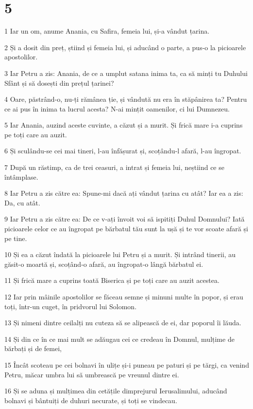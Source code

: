 \chapter{5}

\par 1 Iar un om, anume Anania, cu Safira, femeia lui, și-a vândut țarina.
\par 2 Și a dosit din preț, știind și femeia lui, și aducând o parte, a pus-o la picioarele apostolilor.
\par 3 Iar Petru a zis: Anania, de ce a umplut satana inima ta, ca să minți tu Duhului Sfânt și să dosești din prețul țarinei?
\par 4 Oare, păstrând-o, nu-ți rămânea ție, și vândută nu era în stăpânirea ta? Pentru ce ai pus în inima ta lucrul acesta? N-ai mințit oamenilor, ci lui Dumnezeu.
\par 5 Iar Anania, auzind aceste cuvinte, a căzut și a murit. Și frică mare i-a cuprins pe toți care au auzit.
\par 6 Și sculându-se cei mai tineri, l-au înfășurat și, scoțându-l afară, l-au îngropat.
\par 7 După un răstimp, ca de trei ceasuri, a intrat și femeia lui, neștiind ce se întâmplase.
\par 8 Iar Petru a zis către ea: Spune-mi dacă ați vândut țarina cu atât? Iar ea a zis: Da, cu atât.
\par 9 Iar Petru a zis către ea: De ce v-ați învoit voi să ispitiți Duhul Domnului? Iată picioarele celor ce au îngropat pe bărbatul tău sunt la ușă și te vor scoate afară și pe tine.
\par 10 Și ea a căzut îndată la picioarele lui Petru și a murit. Și intrând tinerii, au găsit-o moartă și, scoțând-o afară, au îngropat-o lângă bărbatul ei.
\par 11 Și frică mare a cuprins toată Biserica și pe toți care au auzit acestea.
\par 12 Iar prin mâinile apostolilor se făceau semne și minuni multe în popor, și erau toți, într-un cuget, în pridvorul lui Solomon.
\par 13 Și nimeni dintre ceilalți nu cuteza să se alipească de ei, dar poporul îi lăuda.
\par 14 Și din ce în ce mai mult se adăugau cei ce credeau în Domnul, mulțime de bărbați și de femei,
\par 15 Încât scoteau pe cei bolnavi în ulițe și-i puneau pe paturi și pe tărgi, ca venind Petru, măcar umbra lui să umbrească pe vreunul dintre ei.
\par 16 Și se aduna și mulțimea din cetățile dimprejurul Ierusalimului, aducând bolnavi și bântuiți de duhuri necurate, și toți se vindecau.

